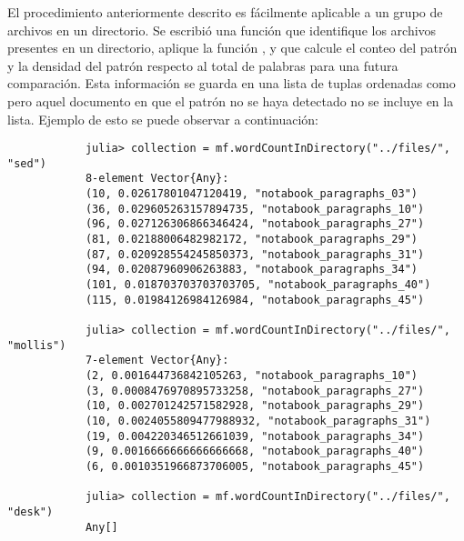 \begin{itemize}
\begin{solution}
        El procedimiento anteriormente descrito es fácilmente aplicable a un grupo de archivos en un directorio. Se escribió una función que identifique los archivos presentes en un directorio, aplique la función , y que calcule el conteo del patrón y la densidad del patrón respecto al total de palabras para una futura comparación. Esta información se guarda en una lista de tuplas ordenadas como  pero aquel documento en que el patrón no se haya detectado no se incluye en la lista. Ejemplo de esto se puede observar a continuación:
        \begin{verbatim}
            julia> collection = mf.wordCountInDirectory("../files/", "sed")
            8-element Vector{Any}:
            (10, 0.02617801047120419, "notabook_paragraphs_03")
            (36, 0.029605263157894735, "notabook_paragraphs_10")
            (96, 0.027126306866346424, "notabook_paragraphs_27")
            (81, 0.02188006482982172, "notabook_paragraphs_29")
            (87, 0.020928554245850373, "notabook_paragraphs_31")
            (94, 0.02087960906263883, "notabook_paragraphs_34")
            (101, 0.018703703703703705, "notabook_paragraphs_40")
            (115, 0.01984126984126984, "notabook_paragraphs_45")

            julia> collection = mf.wordCountInDirectory("../files/", "mollis")
            7-element Vector{Any}:
            (2, 0.001644736842105263, "notabook_paragraphs_10")
            (3, 0.0008476970895733258, "notabook_paragraphs_27")
            (10, 0.002701242571582928, "notabook_paragraphs_29")
            (10, 0.0024055809477988932, "notabook_paragraphs_31")
            (19, 0.004220346512661039, "notabook_paragraphs_34")
            (9, 0.0016666666666666668, "notabook_paragraphs_40")
            (6, 0.0010351966873706005, "notabook_paragraphs_45")
            
            julia> collection = mf.wordCountInDirectory("../files/", "desk")
            Any[]
        \end{verbatim}
        

\end{solution}
\end{itemize}
